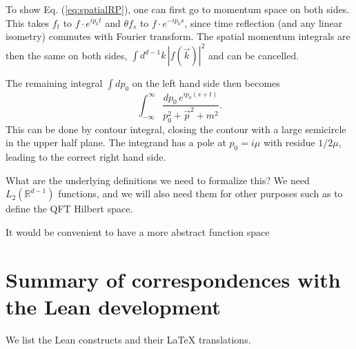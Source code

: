 \documentclass{article}
\newcommand{\1}{\mathbbm{1}}
\theoremstyle{plain}
\theoremstyle{definition}
\numberwithin{equation}{section}
\def\IR{\mathbb{R}}
\newcommand{\be}{\begin{equation}}
\newcommand{\ee}{\end{equation}}
\begin{document}
To show Eq. (\ref{eq:spatialRP}), one can first go to momentum space on both sides.  This takes $f_t$ to $f \cdot e^{ip_0 t}$
and $\theta f_s$ to $f \cdot e^{-ip_0 s}$, since time reflection (and any linear isometry) commutes with Fourier transform.
The spatial momentum integrals are then the same on both sides, $\int d^{d-1} k \, |f(\vec k)|^2$ and can be cancelled.

The remaining integral $\int dp_0$ on the left hand side then becomes 
\be
\int_{-\infty}^\infty \frac{dp_0\, e^{ip_0(s+t)}}{p_0^2 + \vec p^2 + m^2} .
\ee
This can be done by contour integral, closing the contour with a large semicircle in the upper half plane.
The integrand has a pole at $p_0 = i\mu$ with residue $1/2\mu$, leading to the correct right hand side.

What are the underlying definitions we need to formalize this?  We need $L_2(\IR^{d-1})$ functions, and we will
also need them for other purposes such as to define the QFT Hilbert space.

It would be convenient to have a more abstract function space




\section{Summary of correspondences with the Lean development}

We list the Lean constructs and their LaTeX translations.
\end{document}
